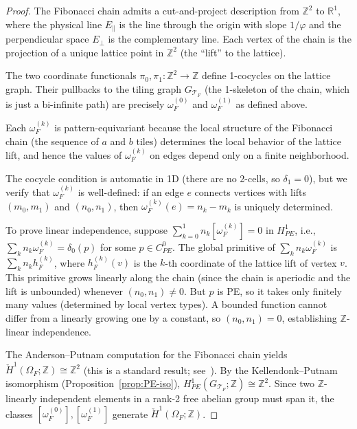 \documentclass[12pt]{article}
\theoremstyle{definition}
\theoremstyle{remark}
\newcommand{\RR}{\mathbb{R}}
\newcommand{\ZZ}{\mathbb{Z}}
\begin{document}
\begin{proof}
The Fibonacci chain admits a cut-and-project description from $\ZZ^2$ to $\RR^1$, where the physical line $E_\parallel$ is the line through the origin with slope $1/\varphi$ and the perpendicular space $E_\perp$ is the complementary line. Each vertex of the chain is the projection of a unique lattice point in $\ZZ^2$ (the ``lift'' to the lattice).

The two coordinate functionals $\pi_0, \pi_1: \ZZ^2 \to \ZZ$ define 1-cocycles on the lattice graph. Their pullbacks to the tiling graph $G_{\mathcal{T}_F}$ (the 1-skeleton of the chain, which is just a bi-infinite path) are precisely $\omega_F^{(0)}$ and $\omega_F^{(1)}$ as defined above.

Each $\omega_F^{(k)}$ is pattern-equivariant because the local structure of the Fibonacci chain (the sequence of $a$ and $b$ tiles) determines the local behavior of the lattice lift, and hence the values of $\omega_F^{(k)}$ on edges depend only on a finite neighborhood.

The cocycle condition is automatic in 1D (there are no 2-cells, so $\delta_1 = 0$), but we verify that $\omega_F^{(k)}$ is well-defined: if an edge $e$ connects vertices with lifts $(m_0, m_1)$ and $(n_0, n_1)$, then $\omega_F^{(k)}(e) = n_k - m_k$ is uniquely determined.

To prove linear independence, suppose $\sum_{k=0}^1 n_k [\omega_F^{(k)}] = 0$ in $H^1_{PE}$, i.e., $\sum_k n_k \omega_F^{(k)} = \delta_0(p)$ for some $p \in C^0_{PE}$. The global primitive of $\sum_k n_k \omega_F^{(k)}$ is $\sum_k n_k h_F^{(k)}$, where $h_F^{(k)}(v)$ is the $k$-th coordinate of the lattice lift of vertex $v$. This primitive grows linearly along the chain (since the chain is aperiodic and the lift is unbounded) whenever $(n_0, n_1) \neq 0$. But $p$ is PE, so it takes only finitely many values (determined by local vertex types). A bounded function cannot differ from a linearly growing one by a constant, so $(n_0, n_1) = 0$, establishing $\ZZ$-linear independence.

The Anderson--Putnam computation for the Fibonacci chain yields $\check{H}^1(\Omega_F; \ZZ) \cong \ZZ^2$ (this is a standard result; see~\cite{AndersonPutnam1998}). By the Kellendonk--Putnam isomorphism (Proposition~\ref{prop:PE-iso}), $H^1_{PE}(G_{\mathcal{T}_F}; \ZZ) \cong \ZZ^2$. Since two $\ZZ$-linearly independent elements in a rank-2 free abelian group must span it, the classes $[\omega_F^{(0)}], [\omega_F^{(1)}]$ generate $\check{H}^1(\Omega_F; \ZZ)$.
\end{proof}
\end{document}
